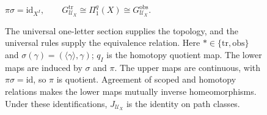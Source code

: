 \begin{figure}[htbp]
\centering
{}

\smallskip
\(\displaystyle
 \pi\sigma=\mathrm{id}_{X^I},\qquad
 G_{\mathcal U_X}^{\mathrm{tr}}\cong\Pi_1^q(X)
 \cong G_{\mathcal U_X}^{\mathrm{obs}}.
\)
\caption{The universal one-letter section supplies the topology, and the
universal rules supply the equivalence relation.  Here
$*\in\{\mathrm{tr},\mathrm{obs}\}$ and
$\sigma(\gamma)=(\langle\gamma\rangle,\gamma)$; $q_I$ is the homotopy
quotient map.  The lower maps are induced by $\sigma$ and $\pi$.
The upper maps are continuous, with $\pi\sigma=\mathrm{id}$, so $\pi$ is
quotient.  Agreement of scoped and homotopy relations makes the lower maps
mutually inverse homeomorphisms.  Under these identifications, $J_{\mathcal U_X}$
is the identity on path classes.}
\label{fig:universal-section}
\end{figure}
